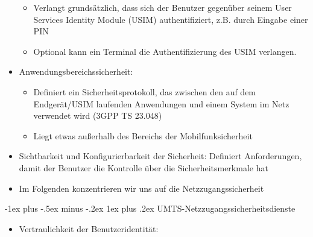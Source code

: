 \documentclass[a4paper]{article}
\makeatletter
\renewcommand{\subsubsection}{\@startsection{subsubsection}{3}{0mm}%
 {-1ex plus -.5ex minus -.2ex}%
 {1ex plus .2ex}%
 {\normalfont\small\bfseries}}
\makeatother
\begin{document}
\begin{multicols}{3}
\begin{itemize}
              \begin{itemize}
                  \item
                        Verlangt grundsätzlich, dass sich der Benutzer gegenüber seinem User
                        Services Identity Module (USIM) authentifiziert, z.B. durch Eingabe
                        einer PIN
                  \item
                        Optional kann ein Terminal die Authentifizierung des USIM verlangen.
              \end{itemize}
        \item
              Anwendungsbereichssicherheit:

              \begin{itemize}
                  \item
                        Definiert ein Sicherheitsprotokoll, das zwischen den auf dem
                        Endgerät/USIM laufenden Anwendungen und einem System im Netz
                        verwendet wird (3GPP TS 23.048)
                  \item
                        Liegt etwas außerhalb des Bereichs der Mobilfunksicherheit
              \end{itemize}
        \item
              Sichtbarkeit und Konfigurierbarkeit der Sicherheit: Definiert
              Anforderungen, damit der Benutzer die Kontrolle über die
              Sicherheitsmerkmale hat
        \item
              Im Folgenden konzentrieren wir uns auf die Netzzugangssicherheit
    \end{itemize}


    \subsubsection{UMTS-Netzzugangssicherheitsdienste}

    \begin{itemize}
        \item
              Vertraulichkeit der Benutzeridentität:


\end{itemize}
\end{multicols}
\end{document}
